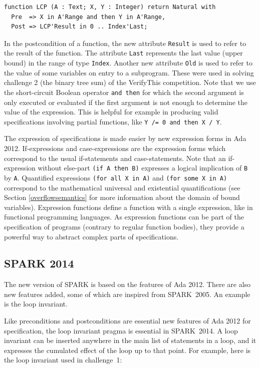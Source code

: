 \documentclass[sttt,final]{svjour}
\newcommand{\oldspark}{SPARK~2005\xspace}
\newcommand{\newspark}{SPARK~2014\xspace}
\begin{document}
\begin{lstlisting}
function LCP (A : Text; X, Y : Integer) return Natural with
  Pre  => X in A'Range and then Y in A'Range,
  Post => LCP'Result in 0 .. Index'Last;
\end{lstlisting}

In the postcondition of a function, the new attribute \verb|Result| is
used to refer to the result of the function. The attribute \verb|Last|
represents the last value (upper bound) in the range of type
\verb|Index|. Another new attribute \verb|Old| is used to refer to the
value of some variables on entry to a subprogram. These were used
in solving challenge 2 (the binary tree sum) of the VerifyThis
competition. Note that we use the short-circuit Boolean operator
\verb|and then| for which the second argument is only executed or
evaluated if the first argument is not enough to determine the value
of the expression. This is helpful for example in producing valid
specifications involving partial functions, like
\verb|Y /= 0 and then X / Y|.

The expression of specifications is made easier by new expression
forms in Ada 2012. If-expressions and case-expressions are the
expression forms which correspond to the usual if-statements and
case-statements. Note that an if-expression without else-part
\verb|(if A then B)| expresses a logical implication of \verb|B| by
\verb|A|. Quantified expressions \verb|(for all X in A)| and
\verb|(for some X in A)| correspond to the mathematical universal and
existential quantifications (see Section \ref{overflowsemantics} for
more information about the domain of bound variables). Expression
functions define a function with a single expression, like in
functional programming languages. As expression functions can be part
of the specification of programs (contrary to regular function
bodies), they provide a powerful way to abstract complex parts of
specifications.

\subsection{SPARK 2014}

The new version of SPARK is based on the features of Ada 2012. There
are also new features added, some of which are inspired from
\oldspark. An example is the loop invariant.

Like preconditions and postconditions are essential new features of
Ada 2012 for specification, the loop invariant pragma is essential in
\newspark. A loop invariant can be inserted anywhere in the main list
of statements in a loop, and it expresses the cumulated effect of the
loop up to that point. For example, here is the loop invariant used in
challenge~1:
\end{document}
